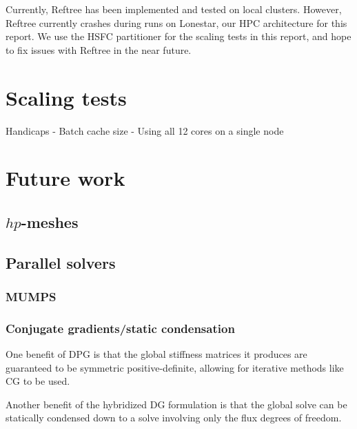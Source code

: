 \documentclass{article}
\begin{document}
Currently, Reftree has been implemented and tested on local clusters. However, Reftree currently crashes during runs on Lonestar, our HPC architecture for this report. We use the HSFC partitioner for the scaling tests in this report, and hope to fix issues with Reftree in the near future. 

\section{Scaling tests}

Handicaps
- Batch cache size 
- Using all 12 cores on a single node

\section{Future work}

\subsection{$hp$-meshes}
\subsection{Parallel solvers}
\subsubsection{MUMPS}
\subsubsection{Conjugate gradients/static condensation}

One benefit of DPG is that the global stiffness matrices it produces are guaranteed to be symmetric positive-definite, allowing for iterative methods like CG to be used. 

Another benefit of the hybridized DG formulation is that the global solve can be statically condensed down to a solve involving only the flux degrees of freedom. 



\end{document}
